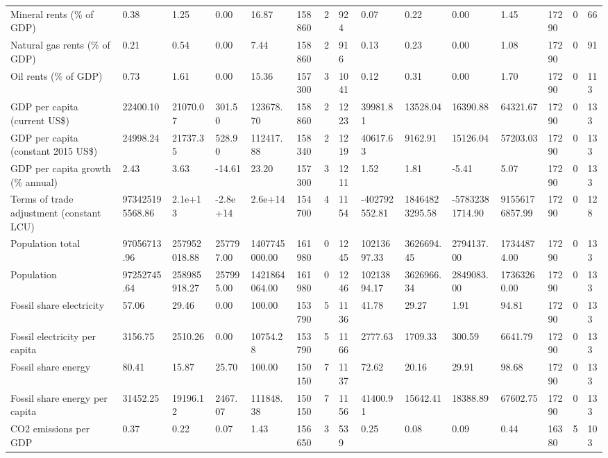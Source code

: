 \begin{longtable}{lllllllllllllll}
\addlinespace
Mineral rents (\% of GDP) & 0.38 & 1.25 & 0.00 & 16.87 & 158860 & 2 & 924 & 0.07 & 0.22 & 0.00 & 1.45 & 17290 & 0 & 66\\
Natural gas rents (\% of GDP) & 0.21 & 0.54 & 0.00 & 7.44 & 158860 & 2 & 916 & 0.13 & 0.23 & 0.00 & 1.08 & 17290 & 0 & 91\\
Oil rents (\% of GDP) & 0.73 & 1.61 & 0.00 & 15.36 & 157300 & 3 & 1041 & 0.12 & 0.31 & 0.00 & 1.70 & 17290 & 0 & 113\\
GDP per capita (current US\$) & 22400.10 & 21070.07 & 301.50 & 123678.70 & 158860 & 2 & 1223 & 39981.81 & 13528.04 & 16390.88 & 64321.67 & 17290 & 0 & 133\\
GDP per capita (constant 2015 US\$) & 24998.24 & 21737.35 & 528.90 & 112417.88 & 158340 & 2 & 1219 & 40617.63 & 9162.91 & 15126.04 & 57203.03 & 17290 & 0 & 133\\
\addlinespace
GDP per capita growth (\% annual) & 2.43 & 3.63 & -14.61 & 23.20 & 157300 & 3 & 1211 & 1.52 & 1.81 & -5.41 & 5.07 & 17290 & 0 & 133\\
Terms of trade adjustment (constant LCU) & 973425195568.86 & 2.1e+13 & -2.8e+14 & 2.6e+14 & 154700 & 4 & 1154 & -402792552.81 & 18464823295.58 & -57832381714.90 & 91556176857.99 & 17290 & 0 & 128\\
Population total & 97056713.96 & 257952018.88 & 257797.00 & 1407745000.00 & 161980 & 0 & 1245 & 10213697.33 & 3626694.45 & 2794137.00 & 17344874.00 & 17290 & 0 & 133\\
Population & 97252745.64 & 258985918.27 & 257995.00 & 1421864064.00 & 161980 & 0 & 1246 & 10213894.17 & 3626966.34 & 2849083.00 & 17363260.00 & 17290 & 0 & 133\\
Fossil share electricity & 57.06 & 29.46 & 0.00 & 100.00 & 153790 & 5 & 1136 & 41.78 & 29.27 & 1.91 & 94.81 & 17290 & 0 & 133\\
\addlinespace
Fossil electricity per capita & 3156.75 & 2510.26 & 0.00 & 10754.28 & 153790 & 5 & 1166 & 2777.63 & 1709.33 & 300.59 & 6641.79 & 17290 & 0 & 133\\
Fossil share energy & 80.41 & 15.87 & 25.70 & 100.00 & 150150 & 7 & 1137 & 72.62 & 20.16 & 29.91 & 98.68 & 17290 & 0 & 133\\
Fossil share energy per capita & 31452.25 & 19196.12 & 2467.07 & 111848.38 & 150150 & 7 & 1156 & 41400.91 & 15642.41 & 18388.89 & 67602.75 & 17290 & 0 & 133\\
CO2 emissions per GDP & 0.37 & 0.22 & 0.07 & 1.43 & 156650 & 3 & 539 & 0.25 & 0.08 & 0.09 & 0.44 & 16380 & 5 & 103\\

\end{longtable}
